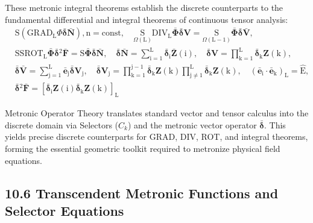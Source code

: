 \documentclass[12pt]{article}
\begin{document}
These metronic integral theorems establish the discrete counterparts to the fundamental differential and integral theorems of continuous tensor analysis:
\begin{equation}
\begin{aligned}
& \mathrm{S}(\mathrm{GRAD}_\mathrm{L} \Phi \bar{\bm{\delta}}\bar{\mathbf{N}}), \mathrm{n} = \text{const}, \quad \underset{\Omega(\mathrm{L})}{\mathrm{S}} \mathrm{DIV}_\mathrm{L} \bar{\bm{\Phi}} \bar{\bm{\delta}}\mathbf{V} = \underset{\Omega(\mathrm{L-1})}{\mathrm{S}} \bar{\bm{\Phi}} \bar{\bm{\delta}}\bar{\mathbf{V}}, \\
& \mathrm{SSROT}_\mathrm{L} \bar{\bm{\Phi}} \bar{\bm{\delta}}{}^2\bar{\mathbf{F}} = \mathrm{S} \bar{\bm{\Phi}} \bar{\bm{\delta}}\bar{\mathbf{N}}, \quad \bar{\bm{\delta}}\bar{\mathbf{N}} = \sum_{\mathrm{i}=1}^\mathrm{L} \bar{\bm{\delta}}_{\mathrm{i}} \bar{\mathbf{Z}}(\mathrm{i}), \quad \bar{\bm{\delta}}\mathbf{V} = \prod_{\mathrm{k}=1}^\mathrm{L} \bar{\bm{\delta}}_{\mathrm{k}} \mathbf{Z}(\mathrm{k}), \\
& \bar{\bm{\delta}}\bar{\mathbf{V}} = \sum_{\mathrm{j}=1}^\mathrm{L} \bar{\mathbf{e}}_\mathrm{j} \bar{\bm{\delta}}\mathbf{V}_\mathrm{j}, \quad \bar{\bm{\delta}}\mathbf{V}_\mathrm{j} = \prod_{\mathrm{k}=1}^{\mathrm{j}-1} \bar{\bm{\delta}}_{\mathrm{k}} \mathbf{Z}(\mathrm{k}) \prod_{\mathrm{j \neq 1}}^\mathrm{L} \bar{\bm{\delta}}_{\mathrm{k}} \mathbf{Z}(\mathrm{k}), \quad (\bar{\mathbf{e}}_\mathrm{i} \cdot \bar{\mathbf{e}}_\mathrm{k})_\mathrm{L} = \hat{\mathrm{E}}, \\
& \bar{\bm{\delta}}{}^2\bar{\mathbf{F}} = \left[ \bar{\bm{\delta}}_{\mathrm{i}} \mathbf{Z}(\mathrm{i}) \bar{\bm{\delta}}_{\mathrm{k}} \mathbf{Z}(\mathrm{k}) \right]_\mathrm{L}
\end{aligned} \tag{80}
\label{eq:original_metronic_integral_theorems}
\end{equation}

Metronic Operator Theory translates standard vector and tensor calculus into the discrete domain via Selectors (\(C_k\)) and the metronic vector operator \(\bar{\bm{\delta}}\). This yields precise discrete counterparts for GRAD, DIV, ROT, and integral theorems, forming the essential geometric toolkit required to metronize physical field equations.

\subsection{10.6 Transcendent Metronic Functions and Selector Equations}
\label{sec:transcendent_functions}
\end{document}

